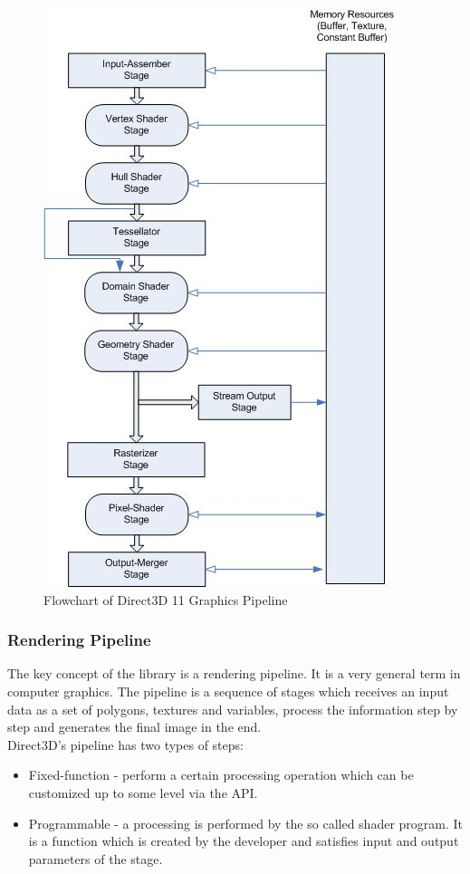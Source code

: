 \documentclass[twoside, english, 11pt]{report}
\begin{document}
 \begin{figure}[!h]
\centerline{\includegraphics[scale=1]{img/pipeline}}
\caption{Flowchart of Direct3D 11 Graphics Pipeline\label{fig:pipeline}}
\end{figure}
\subsubsection{Rendering Pipeline}
The key concept of the library is a rendering pipeline. It is a very general term in computer graphics. The pipeline is a sequence of stages which receives an input data as a set of polygons, textures and variables, process the information step by step and generates the final image in the end.\\

Direct3D's pipeline has two types of steps:
\begin{itemize} 
\item Fixed-function - perform a certain processing operation which can be customized up to some level via the API.
\item Programmable - a processing is performed by the so called shader program. It is a function which is created by the developer and satisfies input and output parameters of the stage.
\end{itemize}
\end{document}
